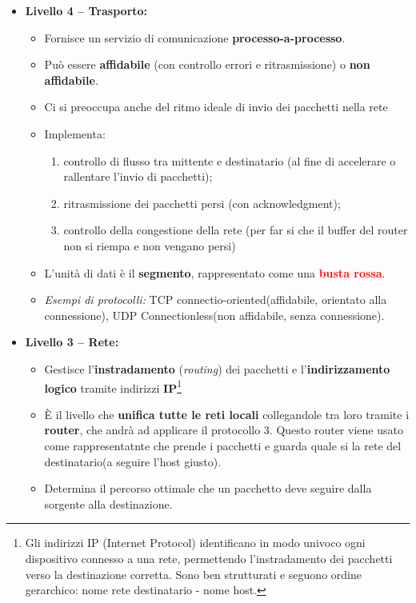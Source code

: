 \documentclass[a4paper,12pt]{report}
\begin{document}
\begin{itemize}
    \item \textbf{Livello 4 – Trasporto:}  
    \begin{itemize}
        \item Fornisce un servizio di comunicazione \textbf{processo-a-processo}.
        \item Può essere \textbf{affidabile} (con controllo errori e ritrasmissione) o \textbf{non affidabile}.
        \item  Ci si preoccupa anche del ritmo ideale di invio dei pacchetti nella rete
        \item Implementa:
        \begin{enumerate}
            \item controllo di flusso tra mittente e destinatario (al fine di accelerare o rallentare l'invio di pacchetti);
            \item ritrasmissione dei pacchetti persi (con acknowledgment);
            \item controllo della congestione della rete (per far si che il buffer del router non si riempa e non vengano persi) 
        \end{enumerate}
        \item L’unità di dati è il \textbf{segmento}, rappresentato come una \textbf{\textcolor{red}{busta rossa}}.
        \item \textit{Esempi di protocolli:} TCP connectio-oriented(affidabile, orientato alla connessione), UDP Connectionless(non affidabile, senza connessione).
    \end{itemize}

    \item \textbf{Livello 3 – Rete:}  
    \begin{itemize}
    \item Gestisce l’\textbf{instradamento} (\textit{routing}) dei pacchetti e l’\textbf{indirizzamento logico} tramite indirizzi \textbf{IP}\footnote{Gli indirizzi IP (Internet Protocol) identificano in modo univoco ogni dispositivo connesso a una rete, permettendo l'instradamento dei pacchetti verso la destinazione corretta. 
    Sono ben strutturati e seguono ordine gerarchico: nome rete destinatario - nome host.}
    
    \item È il livello che \textbf{unifica tutte le reti locali} collegandole tra loro tramite i \textbf{router}, che andrà ad applicare il protocollo 3.
    Questo router viene usato come rappresentatnte che prende i pacchetti e guarda quale si la rete del destinatario(a seguire l'host giusto).
    \item Determina il percorso ottimale che un pacchetto deve seguire dalla sorgente alla destinazione.
    

\end{itemize}
\end{itemize}
\end{document}

